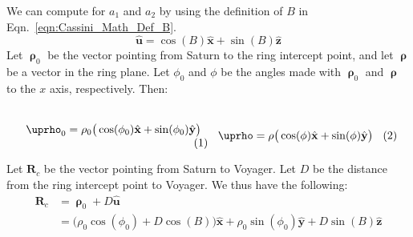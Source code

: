 \documentclass[crop=false,class=book,oneside]{standalone}
\begin{document}
            We can compute for $a_{1}$ and $a_{2}$ by using
            the definition of $B$ in
            Eqn.~\ref{eqn:Cassini_Math_Def_B}.
            \begin{equation}
                \hat{\mathbf{u}}
                =\cos(B)\hat{\mathbf{x}}+
                \sin(B)\hat{\mathbf{z}}
            \end{equation}
            Let $\boldsymbol{\uprho}_{0}$ be the vector pointing
            from Saturn to the ring intercept point,
            and let $\boldsymbol{\uprho}$ be a vector in
            the ring plane. Let $\phi_{0}$ and
            $\phi$ be the angles made with
            $\boldsymbol{\uprho}_{0}$ and $\boldsymbol{\uprho}$
            to the $x$ axis, respectively. Then:
            \par
            \vspace{-1ex}
            \begin{subequations}
                \begin{minipage}{0.49\textwidth}
                    \begin{equation}
                        \boldsymbol{\uprho}_{0}
                        =\rho_{0}\big(\cos(\phi_0)
                        \hat{\mathbf{x}}+
                        \sin(\phi_{0})\hat{\mathbf{y}}\big)
                    \end{equation}
                \end{minipage}
                \hfill
                \begin{minipage}{0.49\textwidth}
                    \begin{equation}
                        \boldsymbol{\uprho}
                        =\rho\big(\cos(\phi)
                        \hat{\mathbf{x}}+
                        \sin(\phi)\hat{\mathbf{y}}\big)
                    \end{equation}
                \end{minipage}
            \end{subequations}
            \par\hfill\par\hfill\par
            \vspace{-1.5ex}
            Let $\mathbf{R}_{c}$ be the vector pointing
            from Saturn to Voyager. Let $D$ be the
            distance from the ring intercept point
            to Voyager.
            We thus have the following:
            \begin{subequations}
                \begin{align}
                    \mathbf{R}_{c}&=
                    \boldsymbol{\uprho}_{0}+
                    D\hat{\mathbf{u}}\\
                    &=\big(
                    \rho_{0}\cos(\phi_0)+D\cos(B)
                    \big)\hat{\mathbf{x}}+
                    \rho_{0}\sin(\phi_{0})\hat{\mathbf{y}}+
                    D\sin(B)\hat{\mathbf{z}}
                \end{align}
            \end{subequations}
\end{document}

